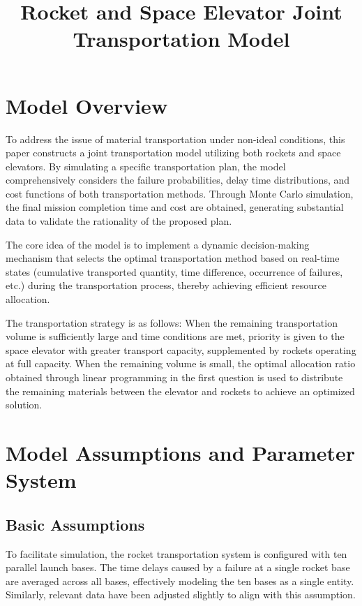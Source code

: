 \documentclass{article}
\title{Rocket and Space Elevator Joint Transportation Model}
\author{}
\date{}
\begin{document}
\maketitle

\section{Model Overview}


To address the issue of material transportation under non-ideal conditions, this paper constructs a joint transportation model utilizing both rockets and space elevators. By simulating a specific transportation plan, the model comprehensively considers the failure probabilities, delay time distributions, and cost functions of both transportation methods. Through Monte Carlo simulation, the final mission completion time and cost are obtained, generating substantial data to validate the rationality of the proposed plan.

The core idea of the model is to implement a dynamic decision-making mechanism that selects the optimal transportation method based on real-time states (cumulative transported quantity, time difference, occurrence of failures, etc.) during the transportation process, thereby achieving efficient resource allocation.

The transportation strategy is as follows: When the remaining transportation volume is sufficiently large and time conditions are met, priority is given to the space elevator with greater transport capacity, supplemented by rockets operating at full capacity. When the remaining volume is small, the optimal allocation ratio obtained through linear programming in the first question is used to distribute the remaining materials between the elevator and rockets to achieve an optimized solution.

\section{Model Assumptions and Parameter System}
\subsection{Basic Assumptions}
To facilitate simulation, the rocket transportation system is configured with ten parallel launch bases. The time delays caused by a failure at a single rocket base are averaged across all bases, effectively modeling the ten bases as a single entity. Similarly, relevant data have been adjusted slightly to align with this assumption.
\end{document}
